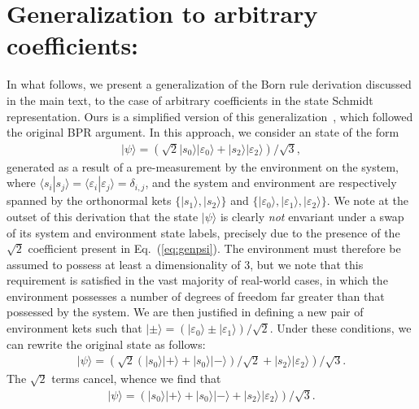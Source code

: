 \documentclass[12pt]{iopart}
\begin{document}
\appendix
\section{Generalization to arbitrary coefficients:}
In what follows, we present a generalization of the Born rule derivation discussed in the main text, to the case of arbitrary coefficients in the state Schmidt representation. Ours is a simplified version of this generalization~\cite{zurek:03a, zurek:05, zurek:14}, which followed the original BPR argument. In this approach, we consider an  state of the form
%
\begin{eqnarray}\label{eq:genpsi}
	|\psi\rangle=\left(\sqrt{2}|s_0\rangle|\varepsilon_0\rangle+|s_2\rangle|\varepsilon_2\rangle\right)/\sqrt{3}, 
\end{eqnarray}
%
generated as a result of a pre-measurement by the environment on the system, where $\langle s_i|s_j\rangle=\langle \varepsilon_i|\varepsilon_j\rangle=\delta_{i,j}$, and the system and environment are respectively spanned by the orthonormal kets $\{|s_1\rangle,|s_2\rangle\}$ and $\{|\varepsilon_0\rangle,|\varepsilon_1\rangle,|\varepsilon_2\rangle\}$. We note at the outset of this derivation that the state $|\psi\rangle$ is clearly \textit{not} envariant under a swap of its system and environment state labels, precisely due to the presence of the $\sqrt{2}$ coefficient present in Eq.~(\ref{eq:genpsi}). The environment must therefore be assumed to possess at least a dimensionality of 3, but we note that this requirement is satisfied in the vast majority of real-world cases, in which the environment possesses a number of degrees of freedom far greater than that possessed by the system. We are then justified in defining a new pair of environment kets such that $|\pm\rangle=\left(|\varepsilon_0\rangle\pm|\varepsilon_1\rangle\right)/\sqrt{2}$. Under these conditions, we can rewrite the original state as follows:
%
\begin{eqnarray}\label{eq:genpsi}
	|\psi\rangle=\left(\sqrt{2}\left(|s_0\rangle|+\rangle+|s_0\rangle|-\rangle\right)/\sqrt{2}+|s_2\rangle|\varepsilon_2\rangle\right)/\sqrt{3}.
\end{eqnarray}
%
The $\sqrt{2}$ terms cancel, whence we find that 
%
\begin{eqnarray}\label{eq:genpsi}
	|\psi\rangle=\left(|s_0\rangle|+\rangle+|s_0\rangle|-\rangle+|s_2\rangle|\varepsilon_2\rangle\right)/\sqrt{3}.
\end{eqnarray}
%
\end{document}
